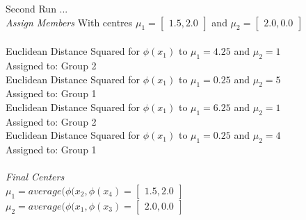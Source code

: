 \documentclass[12pt,letterpaper]{article}
\begin{document}
\begin{enumerate}
\begin{enumerate}
                    Second Run ... \\
                    \textit{Assign Members}
                    With centres  $\mu_{1} =  \begin{bmatrix}1.5, 2.0\end{bmatrix}$  and $\mu_{2} = \begin{bmatrix}2.0, 0.0\end{bmatrix}$ \\ \\
                    Euclidean Distance Squared for $\phi (x_{1})$ to $\mu_{1} = 4.25 $ and $\mu_{2} = 1$ \\
                    Assigned to: Group 2 \\
                    Euclidean Distance Squared for $\phi (x_{1})$ to $\mu_{1} = 0.25 $ and $\mu_{2} = 5$ \\
                    Assigned to: Group 1 \\
                    Euclidean Distance Squared for $\phi (x_{1})$ to $\mu_{1} = 6.25 $ and $\mu_{2} = 1$ \\
                    Assigned to: Group 2 \\
                    Euclidean Distance Squared for $\phi (x_{1})$ to $\mu_{1} = 0.25 $ and $\mu_{2} = 4$ \\
                    Assigned to: Group 1 \\ \\
                    \textit{Final Centers} \\
                    $\mu_{1} = average(\phi (x_{2}, \phi (x_{4}) =  \begin{bmatrix} 1.5, 2.0 \end{bmatrix} $ \\
                    $\mu_{2} = average(\phi (x_{1}, \phi (x_{3}) =  \begin{bmatrix} 2.0, 0.0 \end{bmatrix}$ \\ \\
                    

\end{enumerate}
\end{enumerate}
\end{document}
